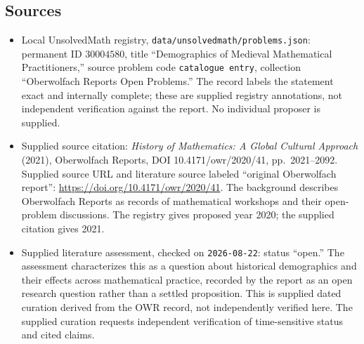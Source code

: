 \documentclass[11pt]{article}
\begin{document}
\subsection{Sources}
\begin{itemize}
\item Local UnsolvedMath registry, \texttt{data/unsolvedmath/problems.json}: permanent ID \(30004580\), title ``Demographics of Medieval Mathematical Practitioners,'' source problem code \texttt{catalogue entry}, collection ``Oberwolfach Reports Open Problems.'' The record labels the statement exact and internally complete; these are supplied registry annotations, not independent verification against the report. No individual proposer is supplied.
\item Supplied source citation: \emph{History of Mathematics: A Global Cultural Approach} (2021), Oberwolfach Reports, DOI 10.4171/owr/2020/41, pp.\ 2021--2092. Supplied source URL and literature source labeled ``original Oberwolfach report'': \url{https://doi.org/10.4171/owr/2020/41}. The background describes Oberwolfach Reports as records of mathematical workshops and their open-problem discussions. The registry gives proposed year 2020; the supplied citation gives 2021.
\item Supplied literature assessment, checked on \texttt{2026-08-22}: status ``open.'' The assessment characterizes this as a question about historical demographics and their effects across mathematical practice, recorded by the report as an open research question rather than a settled proposition. This is supplied dated curation derived from the OWR record, not independently verified here. The supplied curation requests independent verification of time-sensitive status and cited claims.
\end{itemize}
\end{document}
